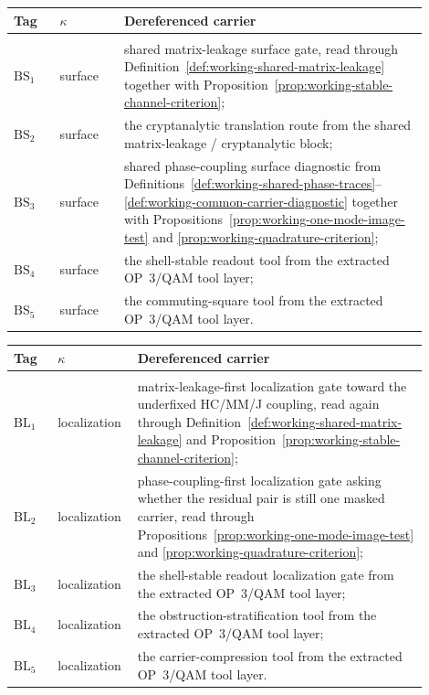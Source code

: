 {\begin{center}
\begin{tabular}{@{}>{\raggedright\arraybackslash}p{0.10\linewidth}>{\raggedright\arraybackslash}p{0.14\linewidth}>{\raggedright\arraybackslash}p{0.66\linewidth}@{}}
\toprule
Tag & $\kappa$ & Dereferenced carrier \\
\midrule
\multicolumn{3}{@{}l@{}}{\textbf{Surface-change submenu} $M^{\mathrm{surf}}_{\mathrm{br}}$}\\[0.2em]
$\mathrm{BS}_1$ & surface & shared matrix-leakage surface gate, read through Definition~\ref{def:working-shared-matrix-leakage} together with Proposition~\ref{prop:working-stable-channel-criterion};\\
$\mathrm{BS}_2$ & surface & the cryptanalytic translation route from the shared matrix-leakage / cryptanalytic block;\\
$\mathrm{BS}_3$ & surface & shared phase-coupling surface diagnostic from Definitions~\ref{def:working-shared-phase-traces}--\ref{def:working-common-carrier-diagnostic} together with Propositions~\ref{prop:working-one-mode-image-test} and \ref{prop:working-quadrature-criterion};\\
$\mathrm{BS}_4$ & surface & the shell-stable readout tool from the extracted OP~3/QAM tool layer;\\
$\mathrm{BS}_5$ & surface & the commuting-square tool from the extracted OP~3/QAM tool layer.\\
\bottomrule
\end{tabular}
\end{center}

\begin{center}
\begin{tabular}{@{}>{\raggedright\arraybackslash}p{0.10\linewidth}>{\raggedright\arraybackslash}p{0.14\linewidth}>{\raggedright\arraybackslash}p{0.66\linewidth}@{}}
\toprule
Tag & $\kappa$ & Dereferenced carrier \\
\midrule
\multicolumn{3}{@{}l@{}}{\textbf{Obstruction-localization submenu} $M^{\mathrm{loc}}_{\mathrm{br}}$}\\[0.2em]
$\mathrm{BL}_1$ & localization & matrix-leakage-first localization gate toward the underfixed HC/MM/J coupling, read again through Definition~\ref{def:working-shared-matrix-leakage} and Proposition~\ref{prop:working-stable-channel-criterion};\\
$\mathrm{BL}_2$ & localization & phase-coupling-first localization gate asking whether the residual pair is still one masked carrier, read through Propositions~\ref{prop:working-one-mode-image-test} and \ref{prop:working-quadrature-criterion};\\
$\mathrm{BL}_3$ & localization & the shell-stable readout localization gate from the extracted OP~3/QAM tool layer;\\
$\mathrm{BL}_4$ & localization & the obstruction-stratification tool from the extracted OP~3/QAM tool layer;\\
$\mathrm{BL}_5$ & localization & the carrier-compression tool from the extracted OP~3/QAM tool layer.\\
\bottomrule
\end{tabular}
\end{center}
}

